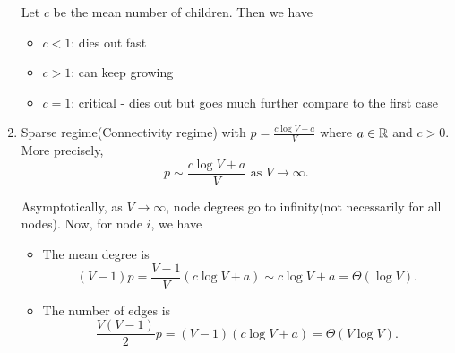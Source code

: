 \begin{enumerate}
\begin{remark}
		      Let \(c\) be the mean number of children. Then we have
		      \begin{itemize}
			      \item \(c<1\): dies out fast
			      \item \(c>1\): can keep growing
			      \item \(c=1\): critical - dies out but goes much further compare to the first case
		      \end{itemize}
	      \end{remark}
	\item Sparse regime(Connectivity regime) with \(p = \frac{c\log V + a}{V}\) where \(a\in\mathbb{\MakeUppercase{R}}\) and \(c>0\).
	      More precisely,
	      \[
		      p\sim \frac{c\log V + a}{V} \text{ as }V\to \infty.
	      \]

	      Asymptotically, as \(V\to \infty \), node degrees go to infinity(not necessarily for all nodes). Now, for node \(i\), we have
	      \begin{itemize}
		      \item The mean degree is
		            \[
			            (V - 1)p = \frac{V-1}{V}(c\log V + a)\sim c\log V + a = \Theta(\log V).
		            \]
		      \item The number of edges is
		            \[
			            \frac{V(V-1)}{2}p = (V - 1)(c\log V + a) = \Theta(V\log V).
		            \]
	      \end{itemize}


\end{enumerate}
